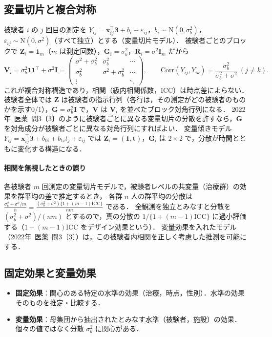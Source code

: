 \documentclass[a4paper,11pt,openany]{ltjsbook}
\newcommand{\tagbox}[2]{\tcbox[on line,boxsep=0.5pt,left=2pt,right=2pt,top=0.5pt,bottom=0.5pt,
  colframe=#1,colback=#1!10,boxrule=0.4pt,arc=1pt]{\scriptsize\bfseries\textcolor{#1}{#2}}}
\newcommand{\Hissu}{\tagbox{bkred}{必須}}
\newcommand{\kakomon}[2]{\mbox{#1年 医薬 問#2}}
\newcommand{\Corr}{\mathrm{Corr}}
\newcommand{\Normal}{\mathrm{N}}
\newcommand{\transp}{^{\top}}
\begin{document}
\subsection{変量切片と複合対称}\label{subsec:08-ri}
\Hissu 被験者 $i$ の $j$ 回目の測定を $Y_{ij}=\bm x_{ij}\transp\bm\beta+b_i+\varepsilon_{ij}$，$b_i\sim\Normal(0,\sigma_b^2)$，$\varepsilon_{ij}\sim\Normal(0,\sigma^2)$（すべて独立）とする（変量切片モデル）．
被験者ごとのブロックで $\bm Z_i=\bm 1_{m}$（$m$ は測定回数），$\bm G_i=\sigma_b^2$，$\bm R_i=\sigma^2\bm I_m$ だから
\[
\bm V_i=\sigma_b^2\bm 1\bm 1\transp+\sigma^2\bm I=
\begin{pmatrix}\sigma^2+\sigma_b^2&\sigma_b^2&\cdots\\ \sigma_b^2&\sigma^2+\sigma_b^2&\cdots\\ \vdots&&\ddots\end{pmatrix},
\qquad \Corr(Y_{ij},Y_{ik})=\frac{\sigma_b^2}{\sigma_b^2+\sigma^2}\ (j\ne k).
\]
これが複合対称構造であり，相関（級内相関係数，ICC）は時点差によらない．
被験者全体では $\bm Z$ は被験者の指示行列（各行は，その測定がどの被験者のものかを示す0/1），$\bm G=\sigma_b^2\bm I$ で，$\bm V$ は $\bm V_i$ を並べたブロック対角行列になる．
\kakomon{2022}{3}〔3〕のように被験者ごとに異なる変量切片の分散を許すなら，$\bm G$ を対角成分が被験者ごとに異なる対角行列にすればよい．
変量傾きモデル $Y_{ij}=\bm x_{ij}\transp\bm\beta+b_{0i}+b_{1i}t_j+\varepsilon_{ij}$ では $\bm Z_i=(\bm1,\bm t)$，$\bm G_i$ は $2\times2$ で，分散が時間とともに変化する構造になる．

\paragraph{相関を無視したときの誤り}
各被験者 $m$ 回測定の変量切片モデルで，被験者レベルの共変量（治療群）の効果を群平均の差で推定するとき，
各群 $n$ 人の群平均の分散は $\frac{\sigma_b^2+\sigma^2/m}{n}=\frac{(\sigma_b^2+\sigma^2)\{1+(m-1)\mathrm{ICC}\}}{nm}$ である．
全観測を独立とみなすと分散を $(\sigma_b^2+\sigma^2)/(nm)$ とするので，真の分散の $1/\{1+(m-1)\mathrm{ICC}\}$ に過小評価する（$1+(m-1)\mathrm{ICC}$ をデザイン効果という）．
変量効果を入れたモデル（\kakomon{2022}{3}〔3〕）は，この被験者内相関を正しく考慮した推測を可能にする．

\subsection{固定効果と変量効果}\label{subsec:08-fixrand}
\begin{itemize}
\item \textbf{固定効果}：関心のある特定の水準の効果（治療，時点，性別）．水準の効果そのものを推定・比較する．
\item \textbf{変量効果}：母集団から抽出されたとみなす水準（被験者，施設）の効果．個々の値ではなく分散 $\sigma_b^2$ に関心がある．
\end{itemize}
\end{document}
